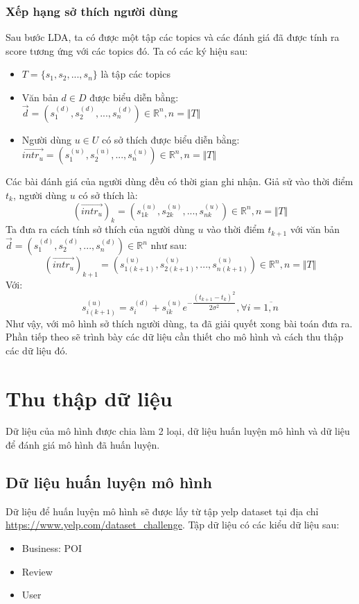 \documentclass[12pt,a4paper]{report}
\begin{document}
\subsection{Xếp hạng sở thích người dùng}
Sau bước LDA, ta có được một tập các topics và các đánh giá đã được tính ra score tương ứng với các topics đó. Ta có các ký hiệu sau:
\begin{itemize}
\item $T = \lbrace s_1, s_2, ..., s_n \rbrace$ là tập các topics
\item Văn bản $d \in D$ được biểu diễn bằng:\\
$\overrightarrow{d} = \left(s_1^{(d)}, s_2^{(d)}, ..., s_n^{(d)} \right) \in \mathbb{R}^n, n = \Vert T \Vert$
\item Người dùng $u \in U$ có sở thích được biểu diễn bằng:\\ 
$\overrightarrow{intr_u} = \left(s_1^{(u)}, s_2^{(u)}, ..., s_n^{(u)} \right) \in \mathbb{R}^n, n = \Vert T \Vert$
\end{itemize}
Các bài đánh giá của người dùng đều có thời gian ghi nhận. Giả sử vào thời điểm $t_k$, người dùng $u$ có sở thích là:
\begin{equation}
\left(\overrightarrow{intr_u}\right)_k = \left(s_{1k}^{(u)}, s_{2k}^{(u)}, ..., s_{nk}^{(u)} \right) \in \mathbb{R}^n, n = \Vert T \Vert
\end{equation}
Ta đưa ra cách tính sở thích của người dùng $u$ vào thời điểm $t_{k+1}$ với văn bản $\overrightarrow{d} = \left(s_1^{(d)}, s_2^{(d)}, ..., s_n^{(d)} \right) \in \mathbb{R}^n$ như sau:
\begin{equation}
\left(\overrightarrow{intr_u}\right)_{k+1} = \left(s_{1(k+1)}^{(u)}, s_{2(k+1)}^{(u)}, ..., s_{n(k+1)}^{(u)} \right) \in \mathbb{R}^n, n = \Vert T \Vert
\end{equation}
Với:
\begin{equation}
s_{i(k+1)}^{(u)} = s_i^{(d)} + s_{ik}^(u)e^{-\dfrac{(t_{k + 1} - t_k)^2}{2\sigma ^2}}, \forall i = \overline{1, n}
\end{equation}
Như vậy, với mô hình sở thích người dùng, ta đã giải quyết xong bài toán đưa ra. Phần tiếp theo sẽ trình bày các dữ liệu cần thiết cho mô hình và cách thu thập các dữ liệu đó.

\chapter{Thu thập dữ liệu}
Dữ liệu của mô hình được chia làm 2 loại, dữ liệu huấn luyện mô hình và dữ liệu để đánh giá mô hình đã huấn luyện.
\section{Dữ liệu huấn luyện mô hình}
Dữ liệu để huấn luyện mô hình sẽ được lấy từ tập yelp dataset tại địa chỉ \url{https://www.yelp.com/dataset_challenge}. Tập dữ liệu có các kiểu dữ liệu sau:
\begin{itemize}
\item Business: POI
\item Review
\item User
\end{itemize}
\end{document}
